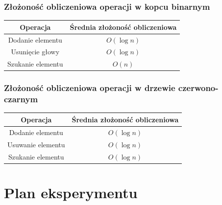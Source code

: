 \documentclass{article}
\begin{document}
        \subsubsection{Złożoność obliczeniowa operacji w kopcu binarnym}
        \begin{center}    
            \begin{tabular}[H]{| c | c |}
                \hline
                Operacja & Średnia złożoność obliczeniowa \\ \hline \hline
                Dodanie elementu & $O(\log n)$ \\ \hline
                Usunięcie głowy & $O(\log n)$ \\ \hline
                Szukanie elementu & $O(n)$ \\ \hline
            \end{tabular}
        \end{center}

        \subsubsection{Złożoność obliczeniowa operacji w drzewie czerwono-czarnym}
        \begin{center}    
            \begin{tabular}[H]{| c | c |}
                \hline
                Operacja & Średnia złożoność obliczeniowa \\ \hline \hline
                Dodanie elementu & $O(\log n)$ \\ \hline
                Usuwanie elementu & $O(\log n)$ \\ \hline
                Szukanie elementu & $O(\log n)$ \\ \hline
            \end{tabular}
        \end{center}
    
\section{Plan eksperymentu}
\end{document}
